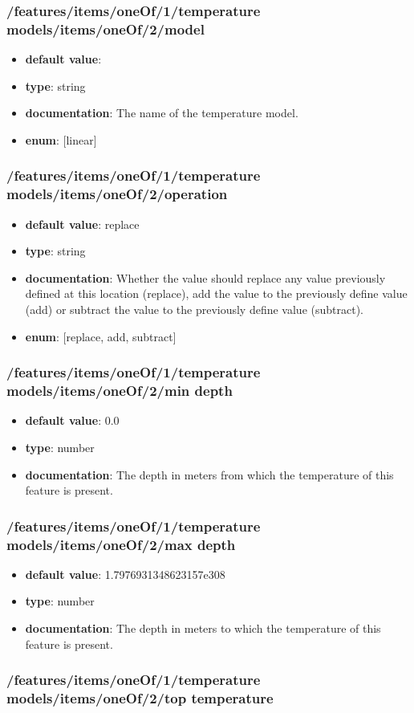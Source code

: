 \subsubsection{/features/items/oneOf/1/temperature models/items/oneOf/2/model}
\begin{itemize}\item {\bf default value}: 
\item {\bf type}: string
\item {\bf documentation}: The name of the temperature model.
\item {\bf enum}: [linear]\end{itemize}\subsubsection{/features/items/oneOf/1/temperature models/items/oneOf/2/operation}
\begin{itemize}\item {\bf default value}: replace
\item {\bf type}: string
\item {\bf documentation}: Whether the value should replace any value previously defined at this location (replace), add the value to the previously define value (add) or subtract the value to the previously define value (subtract).
\item {\bf enum}: [replace, add, subtract]\end{itemize}\subsubsection{/features/items/oneOf/1/temperature models/items/oneOf/2/min depth}
\begin{itemize}\item {\bf default value}: 0.0
\item {\bf type}: number
\item {\bf documentation}: The depth in meters from which the temperature of this feature is present.
\end{itemize}\subsubsection{/features/items/oneOf/1/temperature models/items/oneOf/2/max depth}
\begin{itemize}\item {\bf default value}: 1.7976931348623157e308
\item {\bf type}: number
\item {\bf documentation}: The depth in meters to which the temperature of this feature is present.
\end{itemize}\subsubsection{/features/items/oneOf/1/temperature models/items/oneOf/2/top temperature}
